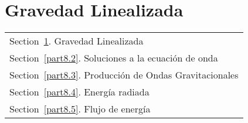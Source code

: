 \documentclass[../main]{subfiles}
\begin{document}
\section{Gravedad Linealizada}\label{part8.1}
        \begin{margintable}\vspace{.8in}\footnotesize
		\begin{tabularx}{\marginparwidth}{|X}
		  Section~\ref{part8.1}. Gravedad Linealizada\\
            Section~\ref{part8.2}. Soluciones a la ecuación de onda\\
            Section~\ref{part8.3}. Producción de Ondas Gravitacionales\\
            Section~\ref{part8.4}. Energía radiada\\
            Section~\ref{part8.5}. Flujo de energía\\
		\end{tabularx}
	\end{margintable}
\end{document}
